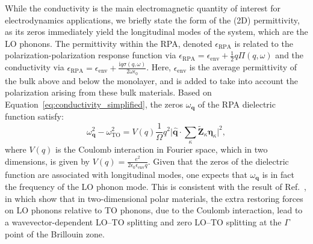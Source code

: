 \documentclass[aps,prb,twocolumn,
	           groupedaddress,superscriptaddress,
               amsfonts,amssymb,amsmath,floatfix,
	           citeautoscript]{revtex4-1}
\newcommand{\iu}{\mathrm{i}}
\begin{document}
While the conductivity is the main electromagnetic quantity of interest for electrodynamics applications, we briefly state the form of the (2D) permittivity, as its zeros immediately yield the longitudinal modes of the system, which are the LO phonons. The permittivity within the RPA, denoted $\epsilon_{\textrm{RPA}}$ is related to the polarization-polarization response function via \cite{jablan2009plasmonics} $\epsilon_{\textrm{RPA}} = \epsilon_{\mathrm{env}} + \frac{1}{2}q\Pi(q,\omega)$ and the conductivity via $\epsilon_{\textrm{RPA}} = \epsilon_{\mathrm{env}} + \frac{\iu q\sigma(q,\omega)}{2\omega\epsilon_0}$. Here, $\epsilon_{\mathrm{env}}$ is the average permittivity of the bulk above and below the monolayer, and is added to take into account the polarization arising from these bulk materials. Based on Equation~\eqref{eq:conductivity_simplified}, the zeros $\omega_{\mathbf{q}}$ of the RPA dielectric function satisfy:
\begin{equation}
    \omega^2_{\mathbf{q}} - \omega^2_{\mathrm{TO}} = V(q)\frac{1}{\Omega}q^2\Big|\hat{\mathbf{q}}\cdot\sum\limits_{\kappa}\tilde{\mathbf{Z}}_{\kappa}\boldsymbol{\eta}_{\kappa}\Big|^2,
    \label{eq:zerosofresponse}
\end{equation}
  where $V(q)$ is the Coulomb interaction in Fourier space, which in two dimensions, is given by $V(q) = \frac{e^2}{2\epsilon_0\epsilon_{\mathrm{env}}q}$. Given that the zeros of the dielectric function are associated with longitudinal modes, one expects that $\omega_{\mathbf{q}}$ is in fact the frequency of the LO phonon mode. This is consistent with the result of Ref.~, in which \relax{{}\ }\citeauthor{sohier2017breakdown} show that in two-dimensional polar materials, the extra restoring forces on LO phonons relative to TO phonons, due to the Coulomb interaction, lead to a wavevector-dependent LO--TO splitting and zero LO--TO splitting at the $\Gamma$ point of the Brillouin zone. 
  
\end{document}
